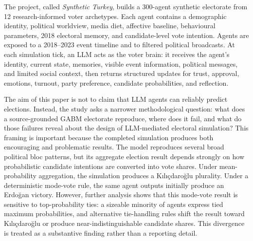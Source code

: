\documentclass[pdflatex,sn-mathphys-num,iicol]{sn-jnl}
\begin{document}
The project, called \textit{Synthetic Turkey}, builds a 300-agent synthetic
electorate from 12 research-informed voter archetypes. Each agent contains a
demographic identity, political worldview, media diet, affective baseline,
behavioural parameters, 2018 electoral memory, and candidate-level vote
intention. Agents are exposed to a 2018--2023 event timeline and to filtered
political broadcasts. At each simulation tick, an LLM acts as the voter brain:
it receives the agent's identity, current state, memories, visible event
information, political messages, and limited social context, then returns
structured updates for trust, approval, emotions, turnout, party preference,
candidate probabilities, and reflection.

The aim of this paper is not to claim that LLM agents can reliably predict
elections. Instead, the study asks a narrower methodological question: what
does a source-grounded GABM electorate reproduce, where does it fail, and what
do those failures reveal about the design of LLM-mediated electoral simulation?
This framing is important because the completed simulation produces both
encouraging and problematic results. The model reproduces several broad
political bloc patterns, but its aggregate election result depends strongly on
how probabilistic candidate intentions are converted into vote shares. Under
mean-probability aggregation, the simulation produces a Kılıçdaroğlu plurality.
Under a deterministic mode-vote rule, the same agent outputs initially produce
an Erdoğan victory. However, further analysis shows that this mode-vote result
is sensitive to top-probability ties: a sizeable minority of agents express tied
maximum probabilities, and alternative tie-handling rules shift the result toward
Kılıçdaroğlu or produce near-indistinguishable candidate shares. This divergence
is treated as a substantive finding rather than a reporting detail.
\end{document}
